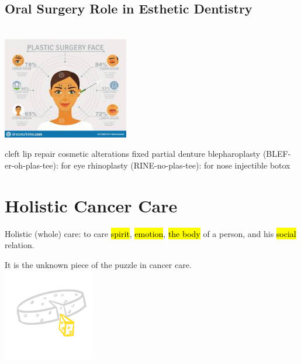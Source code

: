 \documentclass[
paper=landscape,
paper=160mm:90mm, %
fontsize=11pt, %
pagesize, %
parskip=half-, %
]{scrartcl} %
\newenvironment{WrapText1}[3][r]
{\wrapfigure[#2]{#1}{#3}}
{\endwrapfigure}
\newcommand{\wrapr}[6]{
\begin{minipage}{\linewidth}\mbox{}\\
\vspace{#1}
\begin{WrapText1}{#2}{#3}
\vspace{#4}#5\end{WrapText1}#6
\end{minipage}}
\theoremstyle{mythmstyle} %
\begin{document}
\clearpage
\subsection{Oral Surgery Role in Esthetic Dentistry}


\wrapr{-8mm}{7}{6cm}{-1mm}
{%
\includegraphics[width=5.5cm]{plastic_face.jpeg}
} %
{%
\begin{outline}

\1 cleft lip repair
\1 cosmetic alterations
    \2 fixed partial denture
    \2 blepharoplasty (BLEF-er-oh-plas-tee): for eye
    \2 rhinoplasty (RINE-no-plas-tee): for nose
    \2 injectible botox
\end{outline}
} %
\clearpage

%




\section{Holistic Cancer Care} 

\thispagestyle{headings}

Holistic (whole) care: to care \hl{spirit}, \hl{emotion}, \hl{the body} of a person, and his \hl{social} relation.

It is the unknown piece of the puzzle in cancer care.\\
\includegraphics[width=4cm]{piece.jpg}
\end{document}
